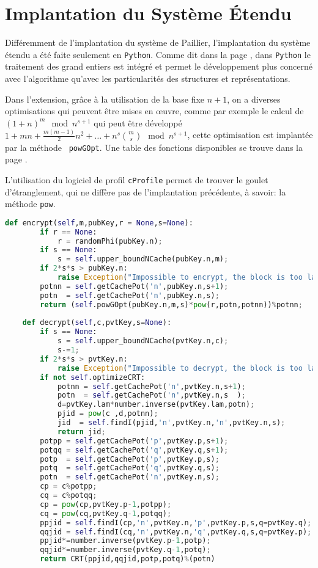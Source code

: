 \chapter{Implantation du Système Étendu}


	Différemment de l'implantation du système de Paillier, l'implantation du système étendu a été faite seulement en \verb!Python!.
	Comme dit dans la page \pageref{chap:implantation}, dans \verb!Python! le traitement des grand entiers est intégré et permet 
	le dé\-ve\-lop\-pe\-ment plus concerné avec l'algorithme qu'avec les particularités des structures et représentations.


	Dans l'extension, grâce à la utilisation de la base fixe $n+1$, on a diverses optimisations qui peuvent être mises en œuvre, comme
	par exemple le calcul de $(1+n)^m\mod{n^{s+1}}$ qui peut être développé $1+mn+\frac{m(m-1)}{2}n^2+\dots+n^s\binom{m}{s}\mod{n^{s+1}}$, 
	cette optimisation est implantée par la méthode ~\verb!powGOpt!. Une table des fonctions disponibles se trouve dans la page \pageref{syset:listef}.


	L'utilisation du logiciel de profil \verb!cProfile! permet de trouver le goulet d'étranglement, qui ne diffère pas de l'implantation
	précédente, à savoir: la méthode \verb!pow!.


	\begin{lstlisting}[language=python,caption=Fonction de chiffrement du système étendu en Python, label=code:chiffet]	
	def encrypt(self,m,pubKey,r = None,s=None):
		if r == None:
			r = randomPhi(pubKey.n);
		if s == None:
			s = self.upper_boundNCache(pubKey.n,m);
		if 2*s*s > pubKey.n:
			raise Exception("Impossible to encrypt, the block is too large");
		potnn = self.getCachePot('n',pubKey.n,s+1);
		potn  = self.getCachePot('n',pubKey.n,s);
		return (self.powGOpt(pubKey.n,m,s)*pow(r,potn,potnn))%potnn;
	
	def decrypt(self,c,pvtKey,s=None):
		if s == None:
			s = self.upper_boundNCache(pvtKey.n,c);
			s-=1;	
		if 2*s*s > pvtKey.n:
			raise Exception("Impossible to decrypt, the block is too large");
		if not self.optimizeCRT:
			potnn = self.getCachePot('n',pvtKey.n,s+1);
			potn  = self.getCachePot('n',pvtKey.n,s  );
			d=pvtKey.lam*number.inverse(pvtKey.lam,potn); 
			pjid = pow(c ,d,potnn);
			jid  = self.findI(pjid,'n',pvtKey.n,'n',pvtKey.n,s);
			return jid;
		potpp = self.getCachePot('p',pvtKey.p,s+1);
		potqq = self.getCachePot('q',pvtKey.q,s+1);
		potp  = self.getCachePot('p',pvtKey.p,s);
		potq  = self.getCachePot('q',pvtKey.q,s);
		potn  = self.getCachePot('n',pvtKey.n,s);
		cp = c%potpp;
		cq = c%potqq;
		cp = pow(cp,pvtKey.p-1,potpp);
		cq = pow(cq,pvtKey.q-1,potqq);
		ppjid = self.findI(cp,'n',pvtKey.n,'p',pvtKey.p,s,q=pvtKey.q);
		qqjid = self.findI(cq,'n',pvtKey.n,'q',pvtKey.q,s,q=pvtKey.p);
		ppjid*=number.inverse(pvtKey.p-1,potp);
		qqjid*=number.inverse(pvtKey.q-1,potq);
		return CRT(ppjid,qqjid,potp,potq)%(potn)
	\end{lstlisting}


